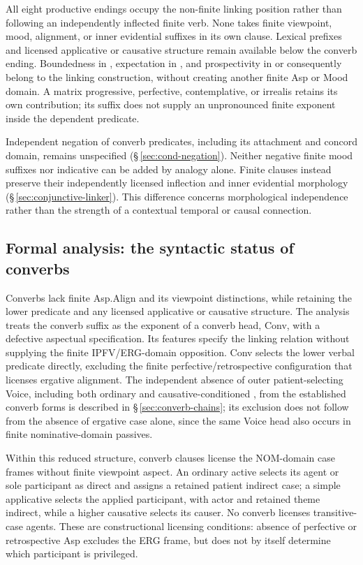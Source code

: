 All eight productive endings occupy the non-finite linking position rather
than following an independently inflected finite verb. None takes finite
viewpoint, mood, alignment, or inner evidential suffixes in its own clause.
Lexical prefixes and licensed applicative or causative structure remain
available below the converb ending. Boundedness in , expectation in
, and prospectivity in  or  consequently
belong to the linking construction, without creating another finite Asp or
Mood domain. A matrix progressive, perfective, contemplative, or irrealis
retains its own contribution; its suffix does not supply an unpronounced
finite exponent inside the dependent predicate.

Independent negation of converb predicates, including its attachment and
concord domain, remains unspecified (§\,\ref{sec:cond-negation}). Neither
negative finite mood suffixes nor indicative  can be added by
analogy alone. Finite  clauses instead preserve their independently
licensed inflection and inner evidential morphology
(§\,\ref{sec:conjunctive-linker}). This difference concerns morphological
independence rather than the strength of a contextual temporal or causal
connection.

\subsection{Formal analysis: the syntactic status of converbs}
\label{sec:vm-converbs}
\label{sec:vm-converb-aspless}\label{sec:vm-converb-case}\label{sec:vm-converb-adjunct}


Converbs lack finite Asp.Align and its viewpoint distinctions, while retaining
the lower predicate and any licensed applicative or causative structure.
The analysis treats the converb suffix as the exponent of a converb head,
Conv, with a defective aspectual specification. Its features specify the
linking relation without supplying
the finite IPFV/ERG-domain opposition. Conv selects the lower verbal
predicate directly, excluding the finite perfective/retrospective configuration
that licenses ergative alignment.
The independent absence of outer patient-selecting Voice, including both
ordinary  and causative-conditioned , from the
established converb forms is described in §\,\ref{sec:converb-chains};
its exclusion does not follow from the absence of ergative case alone, since
the same Voice head also occurs in finite nominative-domain passives.


Within this reduced structure, converb clauses license the NOM-domain case frames without finite viewpoint
aspect. An ordinary active selects its agent or sole participant as direct and
assigns a retained patient indirect case; a simple applicative selects the
applied participant, with actor and retained theme indirect, while a higher
causative selects its causer. No converb licenses transitive-case agents.
These are constructional licensing conditions: absence of perfective or
retrospective Asp excludes the ERG frame, but does not by itself determine
which participant is privileged.


